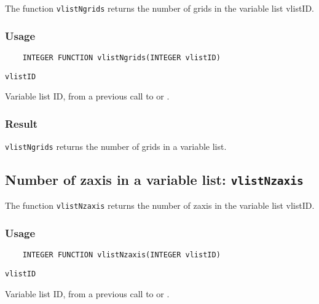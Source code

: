 The function {\tt vlistNgrids} returns the number of grids in the variable list vlistID.

\subsubsection*{Usage}

\begin{verbatim}
    INTEGER FUNCTION vlistNgrids(INTEGER vlistID)
\end{verbatim}

\hspace*{4mm}\begin{minipage}[]{15cm}
\begin{deflist}{\tt vlistID\ }
\item[{\tt vlistID}]
Variable list ID, from a previous call to {} or {}.

\end{deflist}
\end{minipage}

\subsubsection*{Result}

{\tt vlistNgrids} returns the number of grids in a variable list.



\subsection{Number of zaxis in a variable list: {\tt vlistNzaxis}}
\label{vlistNzaxis}

The function {\tt vlistNzaxis} returns the number of zaxis in the variable list vlistID.

\subsubsection*{Usage}

\begin{verbatim}
    INTEGER FUNCTION vlistNzaxis(INTEGER vlistID)
\end{verbatim}

\hspace*{4mm}\begin{minipage}[]{15cm}
\begin{deflist}{\tt vlistID\ }
\item[{\tt vlistID}]
Variable list ID, from a previous call to {} or {}.

\end{deflist}
\end{minipage}

